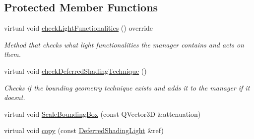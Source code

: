 \subsection*{Protected Member Functions}
\begin{DoxyCompactItemize}
\item 
\mbox{\label{class_geometry_engine_1_1_geometry_world_item_1_1_geometry_light_1_1_deferred_shading_light_abab26a68b727449cebc63160ea35cb52}} 
virtual void \mbox{\hyperlink{class_geometry_engine_1_1_geometry_world_item_1_1_geometry_light_1_1_deferred_shading_light_abab26a68b727449cebc63160ea35cb52}{check\+Light\+Functionalities}} () override
\begin{DoxyCompactList}\small\item\em Method that checks what light functionalities the manager contains and acts on them. \end{DoxyCompactList}\item 
\mbox{\label{class_geometry_engine_1_1_geometry_world_item_1_1_geometry_light_1_1_deferred_shading_light_a844c30b51977a1ec41dd737f7aafbea5}} 
virtual void \mbox{\hyperlink{class_geometry_engine_1_1_geometry_world_item_1_1_geometry_light_1_1_deferred_shading_light_a844c30b51977a1ec41dd737f7aafbea5}{check\+Deferred\+Shading\+Technique}} ()
\begin{DoxyCompactList}\small\item\em Checks if the bounding geometry technique exists and adds it to the manager if it doesn\textquotesingle{}t. \end{DoxyCompactList}\item 
virtual void \mbox{\hyperlink{class_geometry_engine_1_1_geometry_world_item_1_1_geometry_light_1_1_deferred_shading_light_afeb4ce0c059042c837cc853701811be9}{Scale\+Bounding\+Box}} (const Q\+Vector3D \&attenuation)
\item 
virtual void \mbox{\hyperlink{class_geometry_engine_1_1_geometry_world_item_1_1_geometry_light_1_1_deferred_shading_light_a7cab39203d583f1a4b14cb8c56fcb85b}{copy}} (const \mbox{\hyperlink{class_geometry_engine_1_1_geometry_world_item_1_1_geometry_light_1_1_deferred_shading_light}{Deferred\+Shading\+Light}} \&ref)
\end{DoxyCompactItemize}
